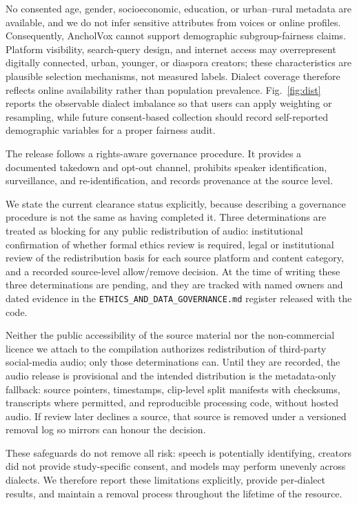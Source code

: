 \documentclass[journal]{IEEEtran}
\begin{document}
No consented age, gender, socioeconomic, education, or urban--rural metadata are
available, and we do not infer sensitive attributes from voices or online
profiles. Consequently, AncholVox cannot support demographic subgroup-fairness
claims. Platform visibility, search-query design, and internet access may
overrepresent digitally connected, urban, younger, or diaspora creators; these
characteristics are plausible selection mechanisms, not measured labels.
Dialect coverage therefore reflects online availability rather than population
prevalence. Fig.~\ref{fig:dist} reports the observable dialect imbalance so that
users can apply weighting or resampling, while future consent-based collection
should record self-reported demographic variables for a proper fairness audit.

The release follows a rights-aware governance procedure. It provides a documented takedown and opt-out channel, prohibits speaker identification, surveillance, and re-identification, and records provenance at the source level.

We state the current clearance status explicitly, because describing a governance procedure is not the same as having completed it. Three determinations are treated as blocking for any public redistribution of audio: institutional confirmation of whether formal ethics review is required, legal or institutional review of the redistribution basis for each source platform and content category, and a recorded source-level allow/remove decision. At the time of writing these three determinations are pending, and they are tracked with named owners and dated evidence in the \texttt{ETHICS\_AND\_DATA\_GOVERNANCE.md} register released with the code.

Neither the public accessibility of the source material nor the non-commercial licence we attach to the compilation authorizes redistribution of third-party social-media audio; only those determinations can. Until they are recorded, the audio release is provisional and the intended distribution is the metadata-only fallback: source pointers, timestamps, clip-level split manifests with checksums, transcripts where permitted, and reproducible processing code, without hosted audio. If review later declines a source, that source is removed under a versioned removal log so mirrors can honour the decision.

These safeguards do not remove all risk: speech is potentially identifying, creators did not provide study-specific consent, and models may perform unevenly across dialects. We therefore report these limitations explicitly, provide per-dialect results, and maintain a removal process throughout the lifetime of the resource.
\end{document}
